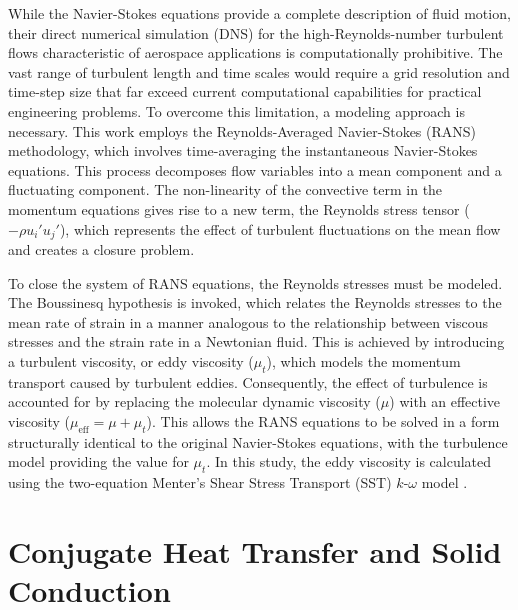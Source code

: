 \documentclass[tg, EN]{ufabcFHZh_tg}
\begin{document}
While the Navier-Stokes equations provide a complete description of fluid motion, their direct numerical simulation (DNS) for the high-Reynolds-number turbulent flows characteristic of aerospace applications is computationally prohibitive. The vast range of turbulent length and time scales would require a grid resolution and time-step size that far exceed current computational capabilities for practical engineering problems. To overcome this limitation, a modeling approach is necessary. This work employs the Reynolds-Averaged Navier-Stokes (RANS) methodology, which involves time-averaging the instantaneous Navier-Stokes equations. This process decomposes flow variables into a mean component and a fluctuating component. The non-linearity of the convective term in the momentum equations gives rise to a new term, the Reynolds stress tensor ($-\rho u_i' u_j'$), which represents the effect of turbulent fluctuations on the mean flow and creates a closure problem.

To close the system of RANS equations, the Reynolds stresses must be modeled. The Boussinesq hypothesis is invoked, which relates the Reynolds stresses to the mean rate of strain in a manner analogous to the relationship between viscous stresses and the strain rate in a Newtonian fluid. This is achieved by introducing a turbulent viscosity, or eddy viscosity ($\mu_t$), which models the momentum transport caused by turbulent eddies. Consequently, the effect of turbulence is accounted for by replacing the molecular dynamic viscosity ($\mu$) with an effective viscosity ($\mu_{\text{eff}} = \mu + \mu_t$). This allows the RANS equations to be solved in a form structurally identical to the original Navier-Stokes equations, with the turbulence model providing the value for $\mu_t$. In this study, the eddy viscosity is calculated using the two-equation Menter's Shear Stress Transport (SST) $k$-$\omega$ model \citep{menter1994}.




\section{Conjugate Heat Transfer and Solid Conduction}
\label{sec:cht_equations}
\end{document}
